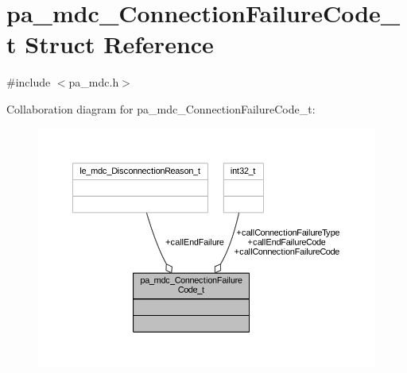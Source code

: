 \hypertarget{structpa__mdc___connection_failure_code__t}{}\section{pa\+\_\+mdc\+\_\+\+Connection\+Failure\+Code\+\_\+t Struct Reference}
\label{structpa__mdc___connection_failure_code__t}


{\ttfamily \#include $<$pa\+\_\+mdc.\+h$>$}



Collaboration diagram for pa\+\_\+mdc\+\_\+\+Connection\+Failure\+Code\+\_\+t\+:
\nopagebreak
\begin{figure}[H]
\begin{center}
\leavevmode
\includegraphics[width=350pt]{structpa__mdc___connection_failure_code__t__coll__graph}
\end{center}
\end{figure}
